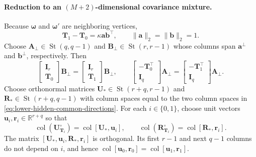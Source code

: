 \documentclass[11pt]{article}
\newcommand{\trans}{\top}
\DeclareMathOperator{\St}{St}
\begin{document}
\paragraph{Reduction to an \texorpdfstring{$(M+2)$}{(M+2)}-dimensional covariance mixture.}
Because $\bm\omega$ and $\bm\omega'$ are neighboring vertices,
\begin{equation}
  \bm T_1-\bm T_0
  =
  \kappa\bm a\bm b^\trans,
  \qquad
  \|\bm a\|_2=\|\bm b\|_2=1.
\label{eq:lower-hidden-rank-one-difference}
\end{equation}
Choose $\bm A_\perp\in\St(q,q-1)$ and
$\bm B_\perp\in\St(r,r-1)$ whose columns span $\bm a^\perp$ and
$\bm b^\perp$, respectively.  Then
\begin{equation}
  \begin{bmatrix}\bm I_r\\ \bm T_0\end{bmatrix}\bm B_\perp
  =
  \begin{bmatrix}\bm I_r\\ \bm T_1\end{bmatrix}\bm B_\perp,
  \qquad
  \begin{bmatrix}-\bm T_0^\trans\\ \bm I_q\end{bmatrix}\bm A_\perp
  =
  \begin{bmatrix}-\bm T_1^\trans\\ \bm I_q\end{bmatrix}\bm A_\perp.
\label{eq:lower-hidden-common-directions}
\end{equation}
Choose orthonormal matrices $\bm U_*\in\St(r+q,r-1)$ and
$\bm R_*\in\St(r+q,q-1)$ with column spaces equal to the two column spaces
in \cref{eq:lower-hidden-common-directions}.  For each $i\in\{0,1\}$,
choose unit vectors $\bm u_i,\bm r_i\in\mathbb R^{r+q}$ so that
\begin{equation}
  \operatorname{col}(\bm U_{\bm T_i}^{\circ})
  =
  \operatorname{col}[\bm U_*,\bm u_i],
  \qquad
  \operatorname{col}(\bm R_{\bm T_i}^{\circ})
  =
  \operatorname{col}[\bm R_*,\bm r_i].
\label{eq:lower-hidden-common-bases}
\end{equation}
The matrix $[\bm U_*,\bm u_i,\bm R_*,\bm r_i]$ is orthogonal.  Its first
$r-1$ and next $q-1$ columns do not depend on $i$, and hence
$\operatorname{col}[\bm u_0,\bm r_0]
=\operatorname{col}[\bm u_1,\bm r_1]$.
\end{document}
